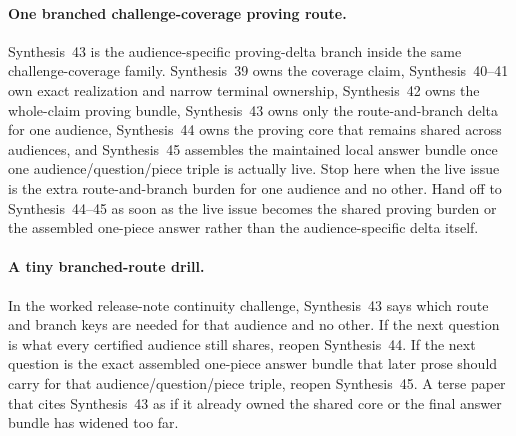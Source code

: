 \documentclass[11pt]{article}
\begin{document}
\paragraph{One branched challenge-coverage proving route.}
Synthesis~43 is the audience-specific proving-delta branch inside the same challenge-coverage family. Synthesis~39 owns the coverage claim, Synthesis~40--41 own exact realization and narrow terminal ownership, Synthesis~42 owns the whole-claim proving bundle, Synthesis~43 owns only the route-and-branch delta for one audience, Synthesis~44 owns the proving core that remains shared across audiences, and Synthesis~45 assembles the maintained local answer bundle once one audience/question/piece triple is actually live. Stop here when the live issue is the extra route-and-branch burden for one audience and no other. Hand off to Synthesis~44--45 as soon as the live issue becomes the shared proving burden or the assembled one-piece answer rather than the audience-specific delta itself.

\paragraph{A tiny branched-route drill.}
In the worked release-note continuity challenge, Synthesis~43 says which route and branch keys are needed for that audience and no other. If the next question is what every certified audience still shares, reopen Synthesis~44. If the next question is the exact assembled one-piece answer bundle that later prose should carry for that audience/question/piece triple, reopen Synthesis~45. A terse paper that cites Synthesis~43 as if it already owned the shared core or the final answer bundle has widened too far.
\end{document}
